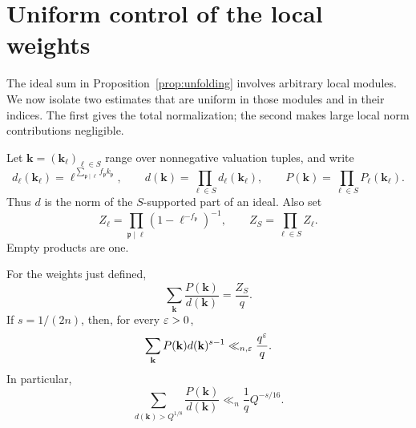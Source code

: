 \section{Uniform control of the local weights}\label{sec:local}

The ideal sum in Proposition~\ref{prop:unfolding} involves arbitrary
local modules. We now isolate two estimates that are uniform in
those modules and in their indices. The first gives the total
normalization; the second makes large local norm contributions
negligible.

Let $\mathbf k=(\mathbf k_\ell)_{\ell\in S}$ range over nonnegative
valuation tuples, and write
\[
 d_\ell(\mathbf k_\ell)
   =\ell^{\sum_{\mathfrak p\mid\ell}f_{\mathfrak p}k_{\mathfrak p}},
 \qquad d(\mathbf k)=\prod_{\ell\in S}d_\ell(\mathbf k_\ell),
 \qquad P(\mathbf k)=\prod_{\ell\in S}P_\ell(\mathbf k_\ell).
\]
Thus $d$ is the norm of the $S$-supported part of an ideal. Also set
\[
 Z_\ell=\prod_{\mathfrak p\mid\ell}
          (1-\ell^{-f_{\mathfrak p}})^{-1},\qquad
 Z_S=\prod_{\ell\in S}Z_\ell.
\]
Empty products are one.

\begin{lemma}\label{lem:local-moment}
For the weights just defined,
\begin{equation}\label{eq:shell-sum}
 \sum_{\mathbf k}\frac{P(\mathbf k)}{d(\mathbf k)}=\frac{Z_S}{q}.
\end{equation}
If $s=1/(2n)$, then, for every $\varepsilon>0$,
\begin{equation}\label{eq:weight-moment}
 \sum_{\mathbf k}P(\mathbf k)d(\mathbf k)^{s-1}
       \ll_{n,\varepsilon}\frac{q^\varepsilon}{q}.
\end{equation}
In particular,
\begin{equation}\label{eq:weight-tail}
 \sum_{d(\mathbf k)>Q^{1/8}}\frac{P(\mathbf k)}{d(\mathbf k)}
       \ll_n \frac1q Q^{-s/16}.
\end{equation}
\end{lemma}

